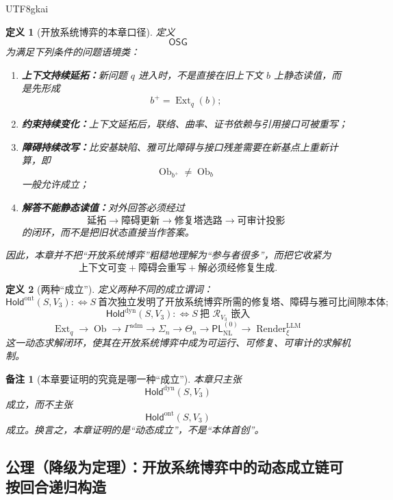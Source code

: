 \documentclass[12pt]{article}
\newtheorem{definition}{定义}[section]
\newtheorem{remark}{备注}[section]
\newcommand{\Render}{\operatorname{Render}}
\begin{document}
\begin{CJK*}{UTF8}{gkai}
\begin{definition}[开放系统博弈的本章口径]
\label{def:tex37-ch19-osg}
定义
\[
  \mathsf{OSG}
\]
为满足下列条件的问题语境类：
\begin{enumerate}
  \item \textbf{上下文持续延拓：}新问题 $q$ 进入时，不是直接在旧上下文 $b$ 上静态读值，而是先形成
  \[
    b^+=\operatorname{Ext}_q(b);
  \]
  \item \textbf{约束持续变化：}上下文延拓后，联络、曲率、证书依赖与引用接口可被重写；
  \item \textbf{障碍持续改写：}比安基缺陷、雅可比障碍与接口残差需要在新基点上重新计算，即
  \[
    \operatorname{Ob}_{b^+}\neq \operatorname{Ob}_b
  \]
  一般允许成立；
  \item \textbf{解答不能静态读值：}对外回答必须经过
  \[
    \text{延拓}
    \to
    \text{障碍更新}
    \to
    \text{修复塔选路}
    \to
    \text{可审计投影}
  \]
  的闭环，而不是把旧状态直接当作答案。
\end{enumerate}
因此，本章并不把“开放系统博弈”粗糙地理解为“参与者很多”，而把它收紧为
\[
  \text{上下文可变}
  +
  \text{障碍会重写}
  +
  \text{解必须经修复生成}.
\]
\end{definition}

\begin{definition}[两种“成立”]
\label{def:tex37-ch19-meanings}
定义两种不同的成立谓词：
\[
  \mathsf{Hold}^{\mathrm{ont}}(S,V_3)
  :\Longleftrightarrow
  S\ \text{首次独立发明了开放系统博弈所需的修复塔、障碍与雅可比间隙本体};
\]
\[
  \mathsf{Hold}^{\mathrm{dyn}}(S,V_3)
  :\Longleftrightarrow
  S\ \text{把 }\mathcal R_{V_3}\text{ 嵌入}
\]
\[
  \operatorname{Ext}_q
  \to
  \operatorname{Ob}
  \to
  \Gamma^{\mathrm{adm}}
  \to
  \Sigma_n
  \to
  \Theta_n
  \to
  \mathsf{PL}_{\mathrm{NL}}^{(0)}
  \to
  \Render^{\mathrm{LLM}}_\xi
\]
这一动态求解闭环，使其在开放系统博弈中成为可运行、可修复、可审计的求解机制。
\end{definition}

\begin{remark}[本章要证明的究竟是哪一种“成立”]
本章只主张
\[
  \mathsf{Hold}^{\mathrm{dyn}}(S,V_3)
\]
成立，而不主张
\[
  \mathsf{Hold}^{\mathrm{ont}}(S,V_3)
\]
成立。换言之，本章证明的是“动态成立”，不是“本体首创”。
\end{remark}

\subsection{公理（降级为定理）：开放系统博弈中的动态成立链可按回合递归构造}
\label{subsec:tex37-ch19-axiom}


\end{CJK*}
\end{document}
